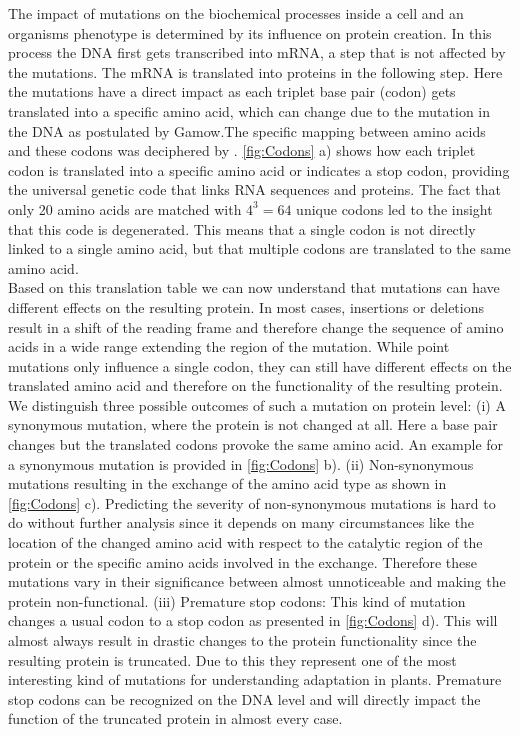 The impact of mutations on the biochemical processes inside a cell and an organisms phenotype is determined by its influence on protein creation. In this process the DNA first gets transcribed into mRNA, a step that is not affected by the mutations. The mRNA is translated into proteins in the following step. Here the mutations have a direct impact as each triplet base pair (codon) gets translated into a specific amino acid, which can change due to the mutation in the DNA as postulated by Gamow\cite{crick1988}.The specific mapping between amino acids and these codons was deciphered by \textcite{Nirenberg1965}. \autoref{fig:Codons} a) shows how each triplet codon is translated into a specific amino acid or indicates a stop codon, providing the universal genetic code that links RNA sequences and proteins. The fact that only 20 amino acids are matched with $4^3 = 64$ unique codons led \textcite{Lagerkvist1978} to the insight that this code is degenerated. This means that a single codon is not directly linked to a single amino acid, but that multiple codons are translated to the same amino acid.\\
Based on this translation table we can now understand that mutations can have different effects on the resulting protein. In most cases, insertions or deletions result in a shift of the reading frame and therefore change the sequence of amino acids in a wide range extending the region of the mutation. While point mutations only influence a single codon, they can still have different effects on the translated amino acid and therefore on the functionality of the resulting protein. We distinguish three possible outcomes of such a mutation on protein level: (i) A synonymous mutation, where the protein is not changed at all. Here a base pair changes but the translated codons provoke the same amino acid. An example for a synonymous mutation is provided in \autoref{fig:Codons} b). (ii) Non-synonymous mutations resulting in the exchange of the amino acid type as shown in \autoref{fig:Codons} c). Predicting the severity of non-synonymous mutations is hard to do without further analysis since it depends on many circumstances like the location of the changed amino acid with respect to the catalytic region of the protein or the specific amino acids involved in the exchange. Therefore these mutations vary in their significance between almost unnoticeable and making the protein non-functional. (iii) Premature stop codons: This kind of mutation changes a usual codon to a stop codon as presented in \autoref{fig:Codons} d). This will almost always result in drastic changes to the protein functionality since the resulting protein is truncated. Due to this they represent one of the most interesting kind of mutations for understanding adaptation in plants. Premature stop codons can be recognized on the DNA level and will directly impact the function of the truncated protein in almost every case.\\
